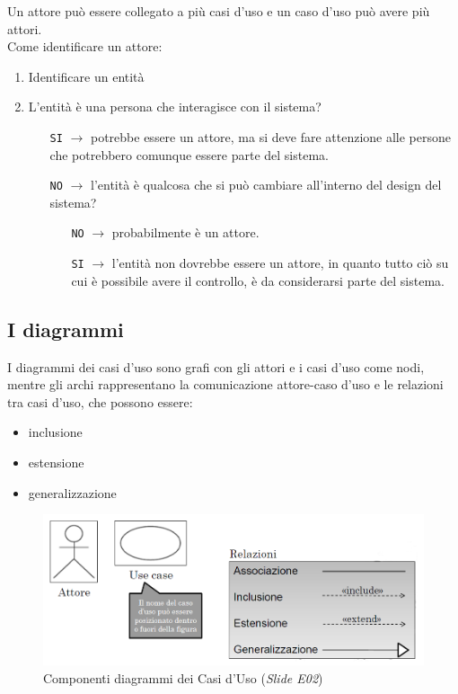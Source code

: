 Un attore può essere collegato a più casi d'uso e un caso d'uso può avere più attori. \\
Come identificare un attore:
\begin{enumerate}
\item Identificare un entità
\item L'entità è una persona che interagisce con il sistema?
\begin{itemize}
\item[\texttt{SI}] $\to$ potrebbe essere un attore, ma si deve fare attenzione alle persone che potrebbero comunque essere parte del sistema.
\item[\texttt{NO}] $\to$ l'entità è qualcosa che si può cambiare all'interno del design del sistema?
\begin{itemize}
\item[\texttt{NO}] $\to$ probabilmente è un attore.
\item[\texttt{SI}] $\to$ l'entità non dovrebbe essere un attore, in quanto tutto ciò su cui è possibile avere il controllo, è da considerarsi parte del sistema.
\end{itemize}
\end{itemize}
\end{enumerate}

\subsection{I diagrammi}

I diagrammi dei casi d'uso sono grafi con gli attori e i casi d'uso come nodi, mentre gli archi rappresentano la comunicazione attore-caso d'uso e le relazioni tra casi d'uso, che possono essere:
\begin{itemize}
\item inclusione
\item estensione
\item generalizzazione
\end{itemize}

\begin{figure}[H]
\centering
    \includegraphics[width=1\textwidth]{res/img/componentiUseCaseDiagram}
    \caption{Componenti diagrammi dei Casi d'Uso (\textit{Slide E02})}
\end{figure}

